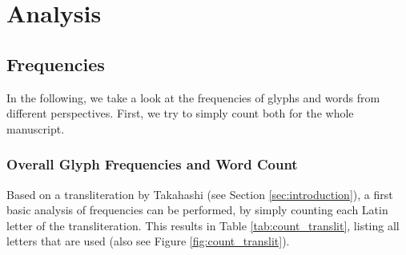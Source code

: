 \documentclass{scrarticle}
\begin{document}
{{{{{{{{{{{{{%
\clearpage
\section{Analysis}\label{sec:analysis}


\subsection{Frequencies}\label{sec:frequencies}
In the following, we take a look at the frequencies of glyphs and words from different perspectives. First, we try to simply count both for the whole manuscript.


\subsubsection{Overall Glyph Frequencies and Word Count}\label{sec:frequencies_overall}
Based on a transliteration by Takahashi (see Section \ref{sec:introduction}), a first basic analysis of frequencies can be performed, by simply counting each Latin letter of the transliteration.
This results in Table \ref{tab:count_translit}, listing all letters that are used (also see Figure \ref{fig:count_translit}).

}}}}}}}}}}}}}
\end{document}
